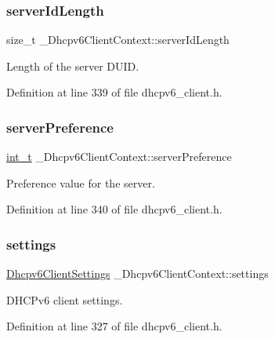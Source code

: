 \subsubsection{\texorpdfstring{server\+Id\+Length}{serverIdLength}}
{\footnotesize\ttfamily size\+\_\+t \+\_\+\+Dhcpv6\+Client\+Context\+::server\+Id\+Length}



Length of the server D\+U\+ID. 



Definition at line 339 of file dhcpv6\+\_\+client.\+h.

\mbox{\label{struct__Dhcpv6ClientContext_ae4691ba34b71cec514356c8ca0c25b53}} 
\subsubsection{\texorpdfstring{server\+Preference}{serverPreference}}
{\footnotesize\ttfamily \hyperlink{compiler__port_8h_a022c65af7f6c8d3947e8a37d64db6ad6}{int\+\_\+t} \+\_\+\+Dhcpv6\+Client\+Context\+::server\+Preference}



Preference value for the server. 



Definition at line 340 of file dhcpv6\+\_\+client.\+h.

\mbox{\label{struct__Dhcpv6ClientContext_ad5fdaa3e9366ce6aeb7038a9e0bd6ff0}} 
\subsubsection{\texorpdfstring{settings}{settings}}
{\footnotesize\ttfamily \hyperlink{structDhcpv6ClientSettings}{Dhcpv6\+Client\+Settings} \+\_\+\+Dhcpv6\+Client\+Context\+::settings}



D\+H\+C\+Pv6 client settings. 



Definition at line 327 of file dhcpv6\+\_\+client.\+h.

